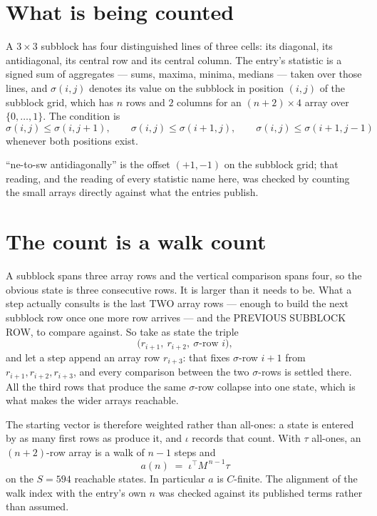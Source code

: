 \documentclass[11pt,a4paper]{article}
\theoremstyle{plain}
\theoremstyle{definition}
\begin{document}
\section{What is being counted}

A $3\times3$ subblock has four distinguished lines of three cells: its diagonal, its
antidiagonal, its central row and its central column. The entry's statistic is a signed sum of
aggregates --- sums, maxima, minima, medians --- taken over those lines, and $\sigma(i,j)$
denotes its value on the subblock in position $(i,j)$ of the subblock grid, which has $n$ rows
and $2$ columns for an $(n+2)\times4$ array over $\{0,\dots,1\}$. The condition is
\[
\sigma(i,j)\le\sigma(i,j+1),\qquad \sigma(i,j)\le\sigma(i+1,j),\qquad \sigma(i,j)\le\sigma(i+1,j-1)
\]
whenever both positions exist.

``ne-to-sw antidiagonally'' is the offset $(+1,-1)$ on the subblock grid; that reading, and
the reading of every statistic name here, was checked by counting the small arrays directly
against what the entries publish.

\section{The count is a walk count}

A subblock spans three array rows and the vertical comparison spans four, so the obvious state
is three consecutive rows. It is larger than it needs to be. What a step actually consults is
the last TWO array rows --- enough to build the next subblock row once one more row arrives ---
and the PREVIOUS SUBBLOCK ROW, to compare against. So take as state the triple
\[
\bigl(r_{i+1},\ r_{i+2},\ \sigma\text{-row }i\bigr),
\]
and let a step append an array row $r_{i+3}$: that fixes $\sigma$-row $i+1$ from
$r_{i+1},r_{i+2},r_{i+3}$, and every comparison between the two $\sigma$-rows is settled
there. All the third rows that produce the same $\sigma$-row collapse into one state, which is
what makes the wider arrays reachable.

The starting vector is therefore weighted rather than all-ones: a state is entered by as many
first rows as produce it, and $\iota$ records that count. With $\tau$ all-ones, an
$(n+2)$-row array is a walk of $n-1$ steps and
\[
a(n)\;=\;\iota^{\!\top}M^{\,n-1}\tau
\]
on the $S=594$ reachable states. In particular $a$ is $C$-finite. The alignment of the walk
index with the entry's own $n$ was checked against its published terms rather than assumed.
\end{document}
